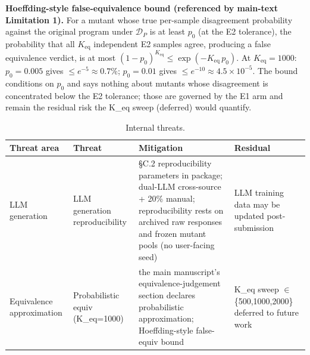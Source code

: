 \documentclass[manuscript,screen,review]{acmart}
\begin{document}
\textbf{Hoeffding-style false-equivalence bound (referenced by
main-text Limitation 1).} For a mutant whose true per-sample
disagreement probability against the original program under $\mathcal{D}_P$ is
at least $p_0$ (at the E2 tolerance), the probability that all
$K_{\mathrm{eq}}$ independent E2 samples agree, producing a false
equivalence verdict, is at most $(1-p_0)^{K_{\mathrm{eq}}} \leq
\exp(-K_{\mathrm{eq}}\,p_0)$. At $K_{\mathrm{eq}} = 1000$: $p_0 =
0.005$ gives $\leq e^{-5} \approx 0.7\%$; $p_0 = 0.01$ gives $\leq
e^{-10} \approx 4.5 \times 10^{-5}$. The bound conditions on $p_0$ and
says nothing about mutants whose disagreement is concentrated below the
E2 tolerance; those are governed by the E1 arm and remain the residual
risk the K\_eq sweep (deferred) would quantify.

{%
\begin{longtable}[]{@{}
  >{\raggedright\arraybackslash}p{}
  >{\raggedright\arraybackslash}p{}
  >{\raggedright\arraybackslash}p{}
  >{\raggedright\arraybackslash}p{}@{}}
\caption{Internal threats.}\label{tab:p2-27}\\
\toprule\noalign{}
\begin{minipage}[b]{\linewidth}\raggedright
Threat area
\end{minipage} & \begin{minipage}[b]{\linewidth}\raggedright
Threat
\end{minipage} & \begin{minipage}[b]{\linewidth}\raggedright
Mitigation
\end{minipage} & \begin{minipage}[b]{\linewidth}\raggedright
Residual
\end{minipage} \\
\midrule\noalign{}
\endfirsthead
\endhead
\bottomrule\noalign{}
\endlastfoot
LLM generation & LLM generation reproducibility & §C.2 reproducibility parameters in
package; dual-LLM cross-source + 20\% manual; reproducibility rests on
archived raw responses and frozen mutant pools (no user-facing seed) & LLM training data may be updated
post-submission \\
Equivalence approximation & Probabilistic equiv (K\_eq=1000) & the main manuscript's equivalence-judgement section declares probabilistic
approximation; Hoeffding-style false-equiv bound & K\_eq sweep $\in$
\{500,1000,2000\} deferred to future work \\

\end{longtable}}
\end{document}
